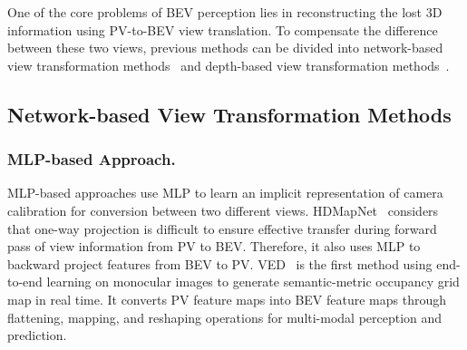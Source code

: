 \documentclass[letterpaper]{article} \usepackage[submission]{aaai24}  \usepackage{times}  \usepackage{helvet}  \usepackage{courier}  \usepackage[hyphens]{url}  \usepackage{graphicx} \urlstyle{rm} \def\UrlFont{\rm}  \usepackage{natbib}  \usepackage{caption} \frenchspacing  \setlength{\pdfpagewidth}{8.5in} \setlength{\pdfpageheight}{11in} \usepackage{algorithm}
\begin{document}
One of the core problems of BEV perception lies in reconstructing the lost 3D information using PV-to-BEV view translation. To compensate the difference between these two views, previous methods can be divided into network-based view transformation methods~\cite{li2021hdmapnet, lu2019monocular, li2022bevformer, wang2022detr3d, liu2022petrv2} and depth-based view transformation methods~\cite{huang2021bevdet, reading2021categorical, you2020pseudolidar++, wang2022mvfcos3d++, wu2022sfd}. 


\subsection{Network-based View Transformation Methods}\label{subsection:network-based}
\subsubsection{MLP-based Approach.}
MLP-based approaches use MLP to learn an implicit representation of camera calibration for conversion between two different views. HDMapNet~\cite{li2021hdmapnet} considers that one-way projection is difficult to ensure effective transfer during forward pass of view information from PV to BEV. Therefore, it also uses MLP to backward project features from BEV to PV. VED~\cite{lu2019monocular} is the first method using end-to-end learning on monocular images to generate semantic-metric occupancy grid map in real time. It converts PV feature maps into BEV feature maps through flattening, mapping, and reshaping operations for multi-modal perception and prediction.
\end{document}
